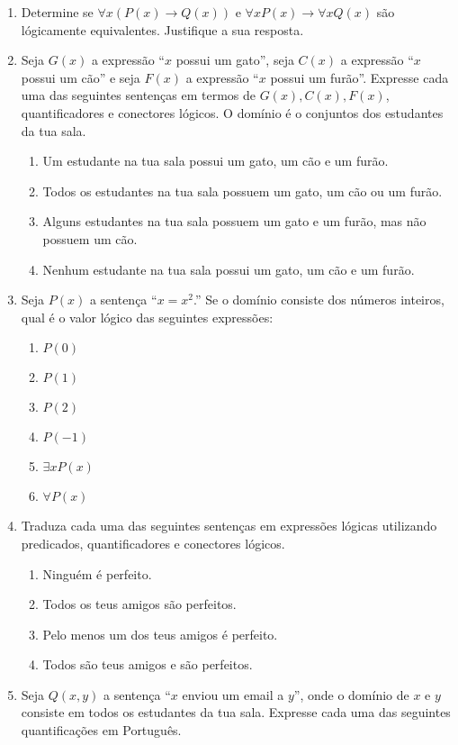 \begin{enumerate}
	\item Determine se $\forall x(P(x) \to Q(x))$ e $\forall xP(x) \to \forall
	xQ(x)$ são lógicamente equivalentes. Justifique a sua resposta.
	\item Seja $G(x)$ a expressão ``$x$ possui um gato'', seja $C(x)$ a expressão
	``$x$ possui um cão'' e seja $F(x)$ a expressão ``$x$ possui um furão''.
	Expresse cada uma das seguintes sentenças em termos de $G(x), C(x), F(x)$,
	quantificadores e conectores lógicos. O domínio é o conjuntos dos estudantes da
	tua sala.
	\begin{enumerate}
		\item Um estudante na tua sala possui um gato, um cão e um furão.
		\item Todos os estudantes na tua sala possuem um gato, um cão ou um furão.
		\item Alguns estudantes na tua sala possuem um gato e um furão, mas não
		possuem um cão.
		\item Nenhum estudante na tua sala possui um gato, um cão e um furão.
	\end{enumerate}
	\item Seja $P(x)$ a sentença ``$x = x^2$.'' Se o domínio consiste dos números
	inteiros, qual é o valor lógico das seguintes expressões:
	\begin{enumerate}
		\item $P(0)$\item $P(1)$\item $P(2)$\item $P(-1)$\item$\exists
		xP(x)$\item$\forall P(x)$
	\end{enumerate}
	\item Traduza cada uma das seguintes sentenças em expressões lógicas utilizando
	predicados, quantificadores e conectores lógicos.
	\begin{enumerate}
		\item Ninguém é perfeito.
		\item Todos os teus amigos são perfeitos.
		\item Pelo menos um dos teus amigos é perfeito.
		\item Todos são teus amigos e são perfeitos.
	\end{enumerate}
	\item Seja $Q(x,y)$ a sentença ``$x$ enviou um email a $y$'', onde o domínio de
	$x$ e $y$ consiste em todos os estudantes da tua sala. Expresse cada uma das
	seguintes quantificações em Português.

\end{enumerate}
